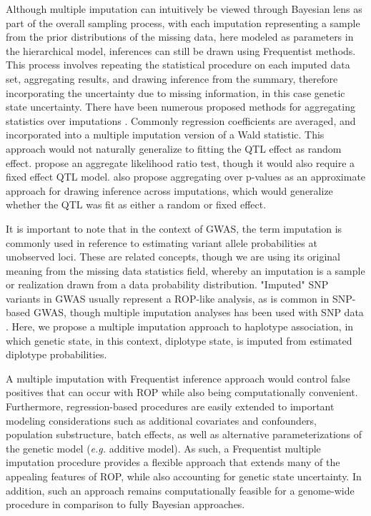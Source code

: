 Although multiple imputation can intuitively be viewed through Bayesian lens as part of the overall sampling process, with each imputation representing a sample from the prior distributions of the missing data, here modeled as parameters in the hierarchical model, inferences can still be drawn using Frequentist methods. This process involves repeating the statistical procedure on each imputed data set, aggregating results, and drawing inference from the summary, therefore incorporating the uncertainty due to missing information, in this case genetic state uncertainty. There have been numerous proposed methods for aggregating statistics over imputations \citep{Li1991}. Commonly regression coefficients are averaged, and incorporated into a multiple imputation version of a Wald statistic. This approach would not naturally generalize to fitting the QTL effect as random effect. \cite{Meng1992} propose an aggregate likelihood ratio test, though it would also require a fixed effect QTL model. \cite{Li1991} also propose aggregating over p-values as an approximate approach for drawing inference across imputations, which would generalize whether the QTL was fit as either a random or fixed effect.

It is important to note that in the context of GWAS, the term imputation is commonly used in reference to estimating variant allele probabilities at unobserved loci. These are related concepts, though we are using its original meaning from the missing data statistics field, whereby an imputation is a sample or realization drawn from a data probability distribution. "Imputed" SNP variants in GWAS usually represent a ROP-like analysis, as is common in SNP-based GWAS, though multiple imputation analyses has been used with SNP data \citep{Ramstein2015}. Here, we propose a multiple imputation approach to haplotype association, in which genetic state, in this context, diplotype state, is imputed from estimated diplotype probabilities. 

A multiple imputation with Frequentist inference approach would control false positives that can occur with ROP while also being computationally convenient. Furthermore, regression-based procedures are easily extended to important modeling considerations such as additional covariates and confounders, population substructure, batch effects, as well as alternative parameterizations of the genetic model (\textit{e.g.} additive model). As such, a Frequentist multiple imputation procedure provides a flexible approach that extends many of the appealing features of ROP, while also accounting for genetic state uncertainty. In addition, such an approach remains computationally feasible for a genome-wide procedure in comparison to fully Bayesian approaches.

